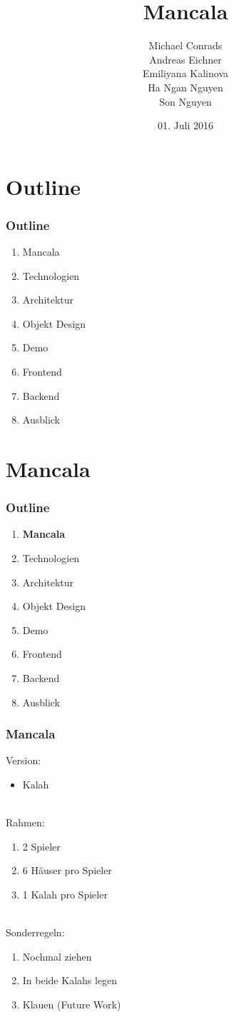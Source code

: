 \documentclass[
	10pt,
	t		%
]{beamer}
\title{Mancala}
\subtitle{}
\author{Michael Conrads \\ Andreas Eichner \\ Emiliyana Kalinova \\ Ha Ngan Nguyen \\ Son Nguyen}
\date{01. Juli 2016}
\begin{document}
\AddToShipoutPicture{\TitlePicture}
\maketitle
\ClearShipoutPicture
\AddToShipoutPicture{\BackgroundPicture}

\section{Outline}
\begin{frame}
\frametitle{Outline}
\begin{enumerate}
\item Mancala
\item Technologien
\item Architektur
\item Objekt Design
\item Demo
\item Frontend
\item Backend
\item Ausblick
\end{enumerate}
\end{frame}

\section{Mancala}
\begin{frame}
\frametitle{Outline}
\begin{enumerate}
\item \textbf{Mancala}
\item Technologien
\item Architektur
\item Objekt Design
\item Demo
\item Frontend
\item Backend
\item Ausblick
\end{enumerate}
\end{frame}

\begin{frame}
\frametitle{Mancala}
Version:
\begin{itemize}
\item Kalah
\end{itemize}
\hfill \\[0.4cm]
Rahmen:
\begin{enumerate}
	\item 2 Spieler
	\item 6 H\"auser pro Spieler
	\item 1 Kalah pro Spieler
\end{enumerate}
\hfill \\[0.4cm]
Sonderregeln:
\begin{enumerate}
	\item Nochmal ziehen
	\item In beide Kalahs legen
	\item Klauen (Future Work)
\end{enumerate}
\end{frame}
\end{document}
